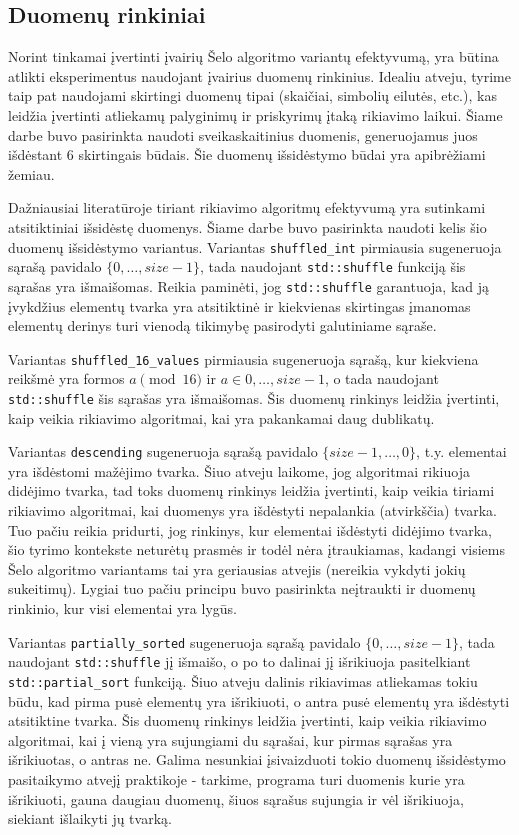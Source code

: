 \documentclass{VUMIFInfBakalaurinis}
\begin{document}
\subsection{Duomenų rinkiniai}

Norint tinkamai įvertinti įvairių Šelo algoritmo variantų efektyvumą, yra būtina atlikti eksperimentus naudojant
įvairius duomenų rinkinius.
Idealiu atveju, tyrime taip pat naudojami skirtingi duomenų tipai (skaičiai, simbolių eilutės, etc.), kas leidžia įvertinti 
atliekamų palyginimų ir priskyrimų įtaką rikiavimo laikui.
Šiame darbe buvo pasirinkta naudoti sveikaskaitinius duomenis, generuojamus juos išdėstant 6 skirtingais būdais.
Šie duomenų išsidėstymo būdai yra apibrėžiami žemiau.

Dažniausiai literatūroje tiriant rikiavimo algoritmų efektyvumą yra sutinkami atsitiktiniai išsidėstę duomenys.
Šiame darbe buvo pasirinkta naudoti kelis šio duomenų išsidėstymo variantus.
Variantas \verb|shuffled_int| pirmiausia sugeneruoja sąrašą pavidalo $\{0, \dots, size-1\}$,
tada naudojant \verb|std::shuffle| funkciją šis sąrašas yra išmaišomas.
Reikia paminėti, jog \verb|std::shuffle| garantuoja, kad ją įvykdžius elementų tvarka yra atsitiktinė ir kiekvienas
skirtingas įmanomas elementų derinys turi vienodą tikimybę pasirodyti galutiniame sąraše.

Variantas \verb|shuffled_16_values| pirmiausia sugeneruoja sąrašą, kur kiekviena reikšmė yra formos $a \pmod{16}$ ir $a \in {0, \dots, size-1}$,
o tada naudojant \verb|std::shuffle| šis sąrašas yra išmaišomas.
Šis duomenų rinkinys leidžia įvertinti, kaip veikia rikiavimo algoritmai, kai yra pakankamai daug dublikatų.

Variantas \verb|descending| sugeneruoja sąrašą pavidalo $\{size-1, \dots, 0 \}$,
t.y. elementai yra išdėstomi mažėjimo tvarka.
Šiuo atveju laikome, jog algoritmai rikiuoja didėjimo tvarka, tad toks duomenų rinkinys leidžia
įvertinti, kaip veikia tiriami rikiavimo algoritmai, kai duomenys yra išdėstyti nepalankia (atvirkščia) tvarka.
Tuo pačiu reikia pridurti, jog rinkinys, kur elementai išdėstyti didėjimo tvarka, šio tyrimo kontekste neturėtų prasmės ir todėl nėra įtraukiamas,
kadangi visiems Šelo algoritmo variantams tai yra geriausias atvejis (nereikia vykdyti jokių sukeitimų).
Lygiai tuo pačiu principu buvo pasirinkta neįtraukti ir duomenų rinkinio, kur visi elementai yra lygūs.

Variantas \verb|partially_sorted| sugeneruoja sąrašą pavidalo $\{0, \dots, size-1\}$,
tada naudojant \verb|std::shuffle| jį išmaišo, o po to dalinai jį išrikiuoja pasitelkiant \verb|std::partial_sort| funkciją.
Šiuo atveju dalinis rikiavimas atliekamas tokiu būdu, kad pirma pusė elementų yra išrikiuoti, o antra pusė elementų yra išdėstyti atsitiktine tvarka.
Šis duomenų rinkinys leidžia įvertinti, kaip veikia rikiavimo algoritmai, kai į vieną yra sujungiami du sąrašai, kur pirmas sąrašas yra išrikiuotas, o antras ne.
Galima nesunkiai įsivaizduoti tokio duomenų išsidėstymo pasitaikymo atvejį praktikoje - tarkime, programa turi duomenis kurie yra išrikiuoti,
gauna daugiau duomenų, šiuos sąrašus sujungia ir vėl išrikiuoja, siekiant išlaikyti jų tvarką.
\end{document}
